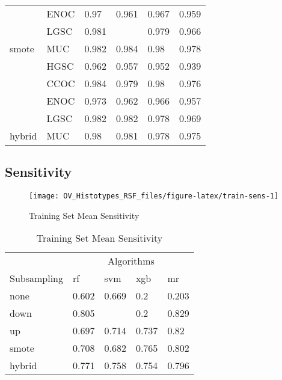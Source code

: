 \documentclass[
]{report}
\begin{document}
\begin{table}
\begin{tabular}[t]{l|l|l|l|l|l}
\cline{2-6}
 & ENOC & 0.97 & 0.961 & 0.967 & 0.959\\
\cline{2-6}
 & LGSC & 0.981 & \cellcolor[HTML]{90ee90}{0.985} & 0.979 & 0.966\\
\cline{2-6}
\multirow{-5}{*}{\raggedright\arraybackslash smote} & MUC & 0.982 & 0.984 & 0.98 & 0.978\\
\cline{1-6}
 & HGSC & 0.962 & 0.957 & 0.952 & 0.939\\
\cline{2-6}
 & CCOC & 0.984 & 0.979 & 0.98 & 0.976\\
\cline{2-6}
 & ENOC & 0.973 & 0.962 & 0.966 & 0.957\\
\cline{2-6}
 & LGSC & 0.982 & 0.982 & 0.978 & 0.969\\
\cline{2-6}
\multirow{-5}{*}{\raggedright\arraybackslash hybrid} & MUC & 0.98 & 0.981 & 0.978 & 0.975\\
\hline
\end{tabular}
\end{table}

\subsection{Sensitivity}\label{sensitivity-1}

\begin{figure}[H]

{\centering \texttt{[image: OV\_Histotypes\_RSF\_files/figure-latex/train-sens-1]} 

}

\caption{Training Set Mean Sensitivity}\label{fig:train-sens}
\end{figure}

\begin{table}

\caption{\label{tab:train-sens-table}Training Set Mean Sensitivity}
\centering
\begin{tabular}[t]{l|l|l|l|l}
\hline
\multicolumn{1}{c|}{ } & \multicolumn{4}{c}{Algorithms} \\
\cline{2-5}
Subsampling & rf & svm & xgb & mr\\
\hline
none & 0.602 & 0.669 & 0.2 & 0.203\\
\hline
down & 0.805 & \cellcolor[HTML]{90ee90}{0.838} & 0.2 & 0.829\\
\hline
up & 0.697 & 0.714 & 0.737 & 0.82\\
\hline
smote & 0.708 & 0.682 & 0.765 & 0.802\\
\hline
hybrid & 0.771 & 0.758 & 0.754 & 0.796\\
\hline
\end{tabular}
\end{table}
\end{document}
